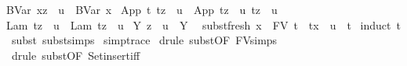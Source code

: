 \begin{isabellebody}
{\isachardoublequoteopen}{\isacharparenleft}BVar\ x{\isacharparenright}{\isacharbrackleft}z\ {\isacharcolon}{\isacharcolon}{\isacharequal}\ u{\isacharbrackright}\ {\isacharequal}\ BVar\ x{\isachardoublequoteclose}\ {\isacharbar}\isanewline
{\isachardoublequoteopen}{\isacharparenleft}App\ t{}\ t{}{\isacharparenright}{\isacharbrackleft}z\ {\isacharcolon}{\isacharcolon}{\isacharequal}\ u{\isacharbrackright}\ {\isacharequal}\ App\ {\isacharparenleft}t{}{\isacharbrackleft}z\ {\isacharcolon}{\isacharcolon}{\isacharequal}\ u{\isacharbrackright}{\isacharparenright}\ {\isacharparenleft}t{}{\isacharbrackleft}z\ {\isacharcolon}{\isacharcolon}{\isacharequal}\ u{\isacharbrackright}{\isacharparenright}{\isachardoublequoteclose}\ {\isacharbar}\isanewline
{\isachardoublequoteopen}{\isacharparenleft}Lam\ t{\isacharparenright}{\isacharbrackleft}z\ {\isacharcolon}{\isacharcolon}{\isacharequal}\ u{\isacharbrackright}\ {\isacharequal}\ Lam\ {\isacharparenleft}t{\isacharbrackleft}z\ {\isacharcolon}{\isacharcolon}{\isacharequal}\ u{\isacharbrackright}{\isacharparenright}{\isachardoublequoteclose}\ {\isacharbar}\isanewline
{\isachardoublequoteopen}{\isacharparenleft}Y\ {\isasymsigma}{\isacharparenright}{\isacharbrackleft}z\ {\isacharcolon}{\isacharcolon}{\isacharequal}\ u{\isacharbrackright}\ {\isacharequal}\ {\isacharparenleft}Y\ {\isasymsigma}{\isacharparenright}{\isachardoublequoteclose}\isanewline
\isanewline
{}\isamarkupfalse%
\ subst{\isacharunderscore}fresh{\isacharcolon}\ {\isachardoublequoteopen}x\ {\isasymnotin}\ FV\ t\ {\isasymLongrightarrow}\ t{\isacharbrackleft}x\ {\isacharcolon}{\isacharcolon}{\isacharequal}\ u{\isacharbrackright}\ {\isacharequal}\ t{\isachardoublequoteclose}\isanewline
%
\isadelimproof
%
\endisadelimproof
%
\isatagproof
{}\isamarkupfalse%
\ {\isacharparenleft}induct\ t{\isacharparenright}\isanewline
{}\isamarkupfalse%
\ {\isacharparenleft}subst\ subst{\isachardot}simps{\isacharparenleft}{}{\isacharparenright}{\isacharparenright}\isanewline
{}\isamarkupfalse%
\ {\isacharbrackleft}{\isacharbrackleft}simp{\isacharunderscore}trace{\isacharbrackright}{\isacharbrackright}\isanewline
{}\isamarkupfalse%
\ {\isacharparenleft}drule\ subst{\isacharbrackleft}OF\ FV{\isachardot}simps{\isacharparenleft}{}{\isacharparenright}{\isacharbrackright}{\isacharparenright}\isanewline
{}\isamarkupfalse%
\ {\isacharparenleft}drule\ subst{\isacharbrackleft}OF\ Set{\isachardot}insert{\isacharunderscore}iff{\isacharbrackright}{\isacharparenright}\isanewline

\end{isabellebody}
